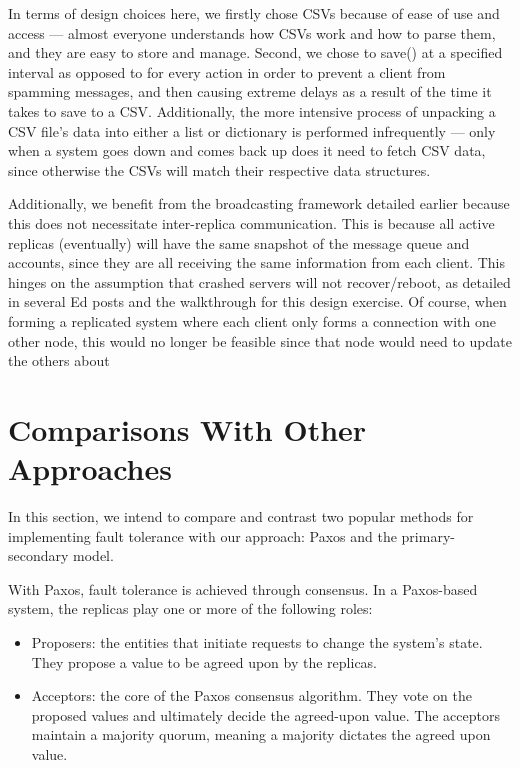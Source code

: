 \documentclass[
	a4paper, %
	10pt, %
	unnumberedsections, %
	twoside, %
]{LTJournalArticle}
\begin{document}
In terms of design choices here, we firstly chose CSVs because of ease of use and access --- almost everyone understands how CSVs work and how to parse them, and they are easy to store and manage. Second, we chose to save() at a specified interval as opposed to for every action in order to prevent a client from spamming messages, and then causing extreme delays as a result of the time it takes to save to a CSV. Additionally, the more intensive process of unpacking a CSV file's data into either a list or dictionary is performed infrequently --- only when a system goes down and comes back up does it need to fetch CSV data, since otherwise the CSVs will match their respective data structures.

Additionally, we benefit from the broadcasting framework detailed earlier because this does not necessitate inter-replica communication. This is because all active replicas (eventually) will have the same snapshot of the message queue and accounts, since they are all receiving the same information from each client. This hinges on the assumption that crashed servers will not recover/reboot, as detailed in several Ed posts and the walkthrough for this design exercise. Of course, when forming a replicated system where each client only forms a connection with one other node, this would no longer be feasible since that node would need to update the others about

\section{Comparisons With Other Approaches}

In this section, we intend to compare and contrast two popular methods for implementing fault tolerance with our approach: Paxos and the primary-secondary model. 

With Paxos, fault tolerance is achieved through consensus. In a Paxos-based system, the replicas play one or more of the following roles:

\begin{itemize}
    \item Proposers: the entities that initiate requests to change the system's state. They propose a value to be agreed upon by the replicas. 
    \item Acceptors: the core of the Paxos consensus algorithm. They vote on the proposed values and ultimately decide the agreed-upon value. The acceptors maintain a majority quorum, meaning a majority dictates the agreed upon value. 
\end{itemize}
\end{document}
